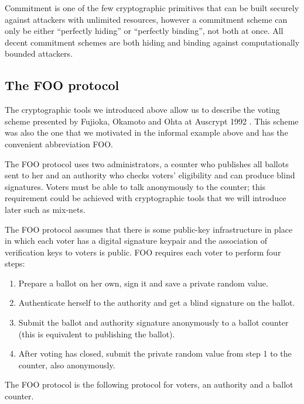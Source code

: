 \documentclass[envcountsame]{llncs}
\begin{document}
Commitment is one of the few cryptographic primitives that can be built securely
against attackers with unlimited resources, however a commitment scheme can only
be either ``perfectly hiding'' or ``perfectly binding'', not both at once.
All decent commitment schemes are both hiding and binding against
computationally bounded attackers.

\subsection{The FOO protocol}

The cryptographic tools we introduced above allow us to describe the voting
scheme presented by Fujioka, Okamoto and Ohta at Auscrypt 1992 \cite{FOO92}.
This scheme was also the one that we motivated in the informal example above and
has the convenient abbreviation FOO.

The FOO protocol uses two administrators, a counter who publishes all ballots
sent to her and an authority who checks voters' eligibility and can produce
blind signatures. Voters must be able to talk anonymously to the counter; this
requirement could be achieved with cryptographic tools that we will introduce
later such as mix-nets.

The FOO protocol assumes that there is some public-key infrastructure in place
in which each voter has a digital signature keypair and the association of
verification keys to voters is public. FOO requires each voter to perform four
steps:
\begin{enumerate}
\item Prepare a ballot on her own, sign it and save a private random value.
\item Authenticate herself to the authority and get a blind signature on the ballot.
\item Submit the ballot and authority signature anonymously to a ballot counter (this is equivalent to publishing the ballot).
\item After voting has closed, submit the private random value from step 1 to the counter, also anonymously.
\end{enumerate}

\begin{definition}
The FOO protocol is the following protocol for voters, an authority and a ballot
counter.
\end{definition}
\end{document}
